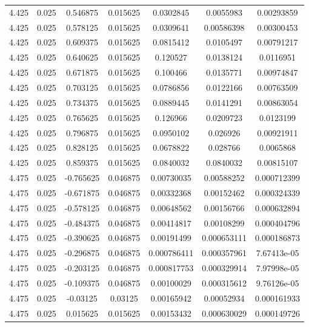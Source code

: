 \begin{table}[bh]
\begin{center}
{\begin{tabular}{ccccccc}
4.425	 & 0.025 & 	0.546875	 & 0.015625	 & 0.0302845	 & 0.0055983	 & 0.00293859 \\ 
4.425	 & 0.025 & 	0.578125	 & 0.015625	 & 0.0309641	 & 0.00586398	 & 0.00300453 \\ 
4.425	 & 0.025 & 	0.609375	 & 0.015625	 & 0.0815412	 & 0.0105497	 & 0.00791217 \\ 
4.425	 & 0.025 & 	0.640625	 & 0.015625	 & 0.120527	 & 0.0138124	 & 0.0116951 \\ 
4.425	 & 0.025 & 	0.671875	 & 0.015625	 & 0.100466	 & 0.0135771	 & 0.00974847 \\ 
4.425	 & 0.025 & 	0.703125	 & 0.015625	 & 0.0786856	 & 0.0122166	 & 0.00763509 \\ 
4.425	 & 0.025 & 	0.734375	 & 0.015625	 & 0.0889445	 & 0.0141291	 & 0.00863054 \\ 
4.425	 & 0.025 & 	0.765625	 & 0.015625	 & 0.126966	 & 0.0209723	 & 0.0123199 \\ 
4.425	 & 0.025 & 	0.796875	 & 0.015625	 & 0.0950102	 & 0.026926	 & 0.00921911 \\ 
4.425	 & 0.025 & 	0.828125	 & 0.015625	 & 0.0678822	 & 0.028766	 & 0.0065868 \\ 
4.425	 & 0.025 & 	0.859375	 & 0.015625	 & 0.0840032	 & 0.0840032	 & 0.00815107 \\ 
4.475	 & 0.025 & 	-0.765625	 & 0.046875	 & 0.00730035	 & 0.00588252	 & 0.000712399 \\ 
4.475	 & 0.025 & 	-0.671875	 & 0.046875	 & 0.00332368	 & 0.00152462	 & 0.000324339 \\ 
4.475	 & 0.025 & 	-0.578125	 & 0.046875	 & 0.00648562	 & 0.00156766	 & 0.000632894 \\ 
4.475	 & 0.025 & 	-0.484375	 & 0.046875	 & 0.00414817	 & 0.00108299	 & 0.000404796 \\ 
4.475	 & 0.025 & 	-0.390625	 & 0.046875	 & 0.00191499	 & 0.000653111	 & 0.000186873 \\ 
4.475	 & 0.025 & 	-0.296875	 & 0.046875	 & 0.000786411	 & 0.000357961	 & 7.67413e-05 \\ 
4.475	 & 0.025 & 	-0.203125	 & 0.046875	 & 0.000817753	 & 0.000329914	 & 7.97998e-05 \\ 
4.475	 & 0.025 & 	-0.109375	 & 0.046875	 & 0.00100029	 & 0.000315612	 & 9.76126e-05 \\ 
4.475	 & 0.025 & 	-0.03125	 & 0.03125	 & 0.00165942	 & 0.00052934	 & 0.000161933 \\ 
4.475	 & 0.025 & 	0.015625	 & 0.015625	 & 0.00153432	 & 0.000630029	 & 0.000149726 \\ 

\end{tabular}}
\end{center}
\end{table}
